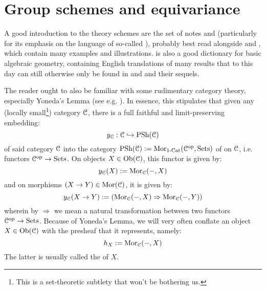 \section{Group schemes and equivariance}
    A good introduction to the theory schemes are the set of notes \cite{scholze_scheme_theory_notes_1} and \cite{scholze_scheme_theory_notes_2} (particularly for its emphasis on the language of so-called ), probably best read alongside \cite{mumford_red_book} and \cite{eisenbud_harris_geometry_of_schemes}, which contain many examples and illustrations. \cite{stacks-project} is also a good dictionary for basic algebraic geometry, containing English translations of many results that to this day can still otherwise only be found in \cite{ega1} and \cite{SGA1} and their sequels.
    
    The reader ought to also be familiar with some rudimentary category theory, especially Yoneda's Lemma (see e.g. \cite[\href{https://stacks.math.columbia.edu/tag/001P}{Tag 001P}]{stacks-project}). In essence, this stipulates that given any (locally small\footnote{This is a set-theoretic subtlety that won't be bothering us.}) category $\mathcal{C}$, there is a full faithful and limit-preserving embedding:
        $$y_{\mathcal{C}}: \mathcal{C} \hookrightarrow \mathrm{PSh}(\mathcal{C})$$
    of said category $\mathcal{C}$ into the category $\mathrm{PSh}(\mathcal{C}) := \mathrm{Mor}_{1\text{-}\mathrm{Cat}}(\mathcal{C}^{\mathrm{op}}, \mathrm{Sets})$ of  on $\mathcal{C}$, i.e. functors $\mathcal{C}^{\mathrm{op}} \to \mathrm{Sets}$. On objects $X \in \mathrm{Ob}(\mathcal{C})$, this functor is given by:
        $$y_{\mathcal{C}}(X) := \mathrm{Mor}_{\mathcal{C}}(-, X)$$
    and on morphisms $(X \to Y) \in \mathrm{Mor}(\mathcal{C})$, it is given by:
        $$y_{\mathcal{C}}(X \to Y) := \left( \mathrm{Mor}_{\mathcal{C}}(-, X) \Rightarrow \mathrm{Mor}_{\mathcal{C}}(-, Y) \right)$$
    wherein by $\Rightarrow$ we mean a natural transformation between two functors $\mathcal{C}^{\mathrm{op}} \to \mathrm{Sets}$. Because of Yoneda's Lemma, we will very often conflate an object $X \in \mathrm{Ob}(\mathcal{C})$ with the presheaf that it represents, namely:
        $$h_X := \mathrm{Mor}_{\mathcal{C}}(-, X)$$
    The latter is usually called the  of $X$.

